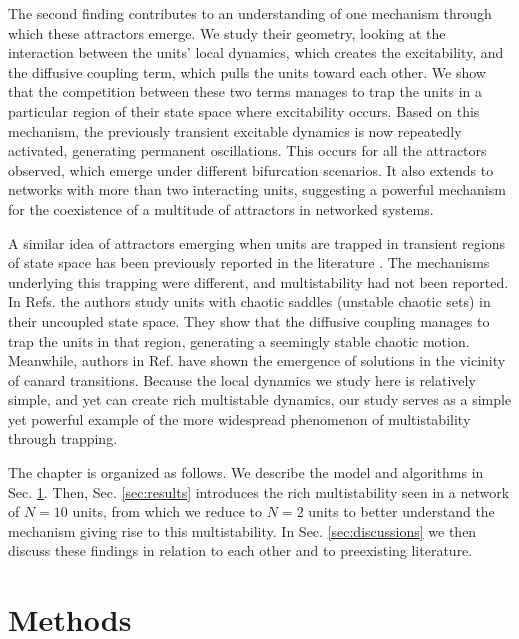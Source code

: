 The second finding contributes to an understanding of one mechanism through which these attractors emerge. We study their geometry, looking at the interaction between the units' local dynamics, which creates the excitability, and the diffusive coupling term, which pulls the units toward each other. We show that the competition between these two terms manages to trap the units in a particular region of their state space where excitability occurs. Based on this mechanism, the previously transient excitable dynamics is now repeatedly activated, generating permanent oscillations. This occurs for all the attractors observed, which emerge under different bifurcation scenarios. It also extends to networks with more than two interacting units, suggesting a powerful mechanism for the coexistence of a multitude of attractors in networked systems. 
 
A similar idea of attractors emerging when units are trapped in transient regions of state space has been previously reported in the literature \cite{medeiros2018boundaries, medeiros2019state, medeiros2021the, contreras2023scale, medeiros2023transient}. The mechanisms underlying this trapping were different, and multistability had not been reported. In Refs. \cite{medeiros2018boundaries, medeiros2019state, medeiros2021the} the authors study units with chaotic saddles (unstable chaotic sets) in their uncoupled state space. They show that the diffusive coupling manages to trap the units in that region, generating a seemingly stable chaotic motion. Meanwhile, authors in Ref. \cite{contreras2023scale} have shown the emergence of solutions in the vicinity of canard transitions. Because the local dynamics we study here is relatively simple, and yet can create rich multistable dynamics, our study serves as a simple yet powerful example of the more widespread phenomenon of multistability through trapping. 

The chapter is organized as follows. We describe the model and algorithms in Sec. \ref{sec:methods}. Then, Sec. \ref{sec:results} introduces the rich multistability seen in a network of $N=10$ units, from which we reduce to $N=2$ units to better understand the mechanism giving rise to this multistability. In Sec. \ref{sec:discussions} we then discuss these findings in relation to each other and to preexisting literature.

\section{Methods}\label{sec:methods}
